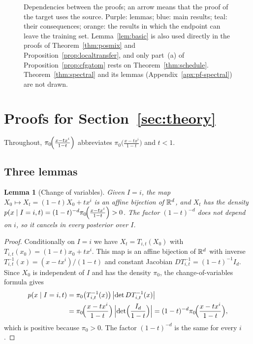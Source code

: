 \documentclass{article} %
\newcommand{\iclrbr}{\\&}\newcommand{\iclrbrq}{\\&\qquad}\newcommand{\iclrqbr}{\\&}
\newcommand{\iclrbr}{}\newcommand{\iclrbrq}{}\newcommand{\iclrqbr}{\qquad}
\theoremstyle{plain}
\newtheorem{lemma}[theorem]{Lemma}
\theoremstyle{definition}
\theoremstyle{remark}
\begin{document}
\begin{figure}[t]
\centering
\resizebox{\textwidth}{!}{}
\caption{Dependencies between the proofs; an arrow means that the proof of the target uses the
source. Purple: lemmas; blue: main results; teal: their consequences; orange: the results in
which the endpoint can leave the training set. Lemma~\ref{lem:basic} is also used directly in the
proofs of Theorem~\ref{thm:posmix} and Proposition~\ref{prop:localtransfer}, and only part~(a)
of Proposition~\ref{prop:cfgatom} rests on Theorem~\ref{thm:schedule}. Theorem~\ref{thm:spectral}
and its lemmas (Appendix~\ref{apx:pf-spectral}) are not drawn.}
\label{fig:proof-dependencies}
\end{figure}

\section{Proofs for Section~\ref{sec:theory}}
\label{app:proofs}

Throughout, $\pi_0\!\Big(\frac{x-tx^{i}}{1-t}\Big)$ abbreviates $\pi_0\big(\frac{x-tx^i}{1-t}\big)$ and $t<1$.

\subsection{Three lemmas}
\label{apx:lemmas}

\begin{lemma}[Change of variables]
\label{lem:cov}
Given $I=i$, the map $X_0\mapsto X_t=(1-t)X_0+tx^i$ is an affine bijection of $\mathbb{R}^d$, and
$X_t$ has the density $p(x\mid I=i,t)=(1-t)^{-d}\pi_0\!\Big(\frac{x-tx^{i}}{1-t}\Big)>0$. The factor $(1-t)^{-d}$ does not
depend on $i$, so it cancels in every posterior over $I$.
\end{lemma}
\begin{proof}
Conditionally on $I=i$ we have $X_t=T_{i,t}(X_0)$ with $T_{i,t}(x_0)=(1-t)x_0+tx^i$. This map is
an affine bijection of $\mathbb{R}^d$ with inverse $T_{i,t}^{-1}(x)=(x-tx^i)/(1-t)$ and constant Jacobian
$DT_{i,t}^{-1}=(1-t)^{-1}I_d$. Since $X_0$ is independent of $I$ and has the density $\pi_0$, the
change-of-variables formula gives
\begin{align*}
p(x\mid I=i,t)
&=\pi_0\bigl(T_{i,t}^{-1}(x)\bigr)\,\bigl|\det DT_{i,t}^{-1}(x)\bigr|
\iclrbr=\src{i}\,\Bigl|\det\Bigl(\frac{I_d}{1-t}\Bigr)\Bigr|
=(1-t)^{-d}\src{i},
\end{align*}
which is positive because $\pi_0>0$. The factor $(1-t)^{-d}$ is the same for every $i$.
\end{proof}
\end{document}
